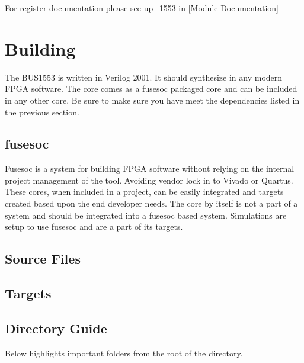 For register documentation please see up\_1553 in \ref{Module Documentation}

\section{Building}

\par
The BUS1553 is written in Verilog 2001. It should synthesize in any modern FPGA software. The core comes as a fusesoc packaged core and can be
included in any other core. Be sure to make sure you have meet the dependencies listed in the previous section.

\subsection{fusesoc}
\par
Fusesoc is a system for building FPGA software without relying on the internal project management of the tool. Avoiding vendor lock in to Vivado or Quartus.
These cores, when included in a project, can be easily integrated and targets created based upon the end developer needs. The core by itself is not a part of
a system and should be integrated into a fusesoc based system. Simulations are setup to use fusesoc and are a part of its targets.

\subsection{Source Files}







\subsection{Targets}







\subsection{Directory Guide}

\par
Below highlights important folders from the root of the directory.


